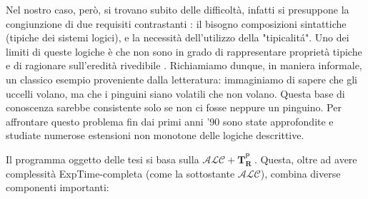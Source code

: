 Nel nostro caso, però, si trovano subito delle difficoltà, infatti si presuppone 
la congiunzione di due requisiti contrastanti : il bisogno composizioni sintattiche 
(tipiche dei sistemi logici), e la necessità dell'utilizzo della "tipicalitá".
Uno dei limiti di queste logiche è che non sono in grado di rappresentare proprietà tipiche
e di ragionare sull'eredità rivedibile \cite{ProbOfEx}.
Richiamiamo dunque, in maniera informale, un classico esempio proveniente dalla letteratura: 
immaginiamo di sapere che gli uccelli volano, ma che i pinguini siano volatili che non volano.
Questa base di conoscenza sarebbe consistente solo se non ci fosse neppure un pinguino. 
Per affrontare questo problema fin dai primi anni '90 sono state approfondite e studiate 
numerose estensioni non monotone delle logiche descrittive.\par
Il programma oggetto delle tesi si basa sulla $\mathcal {ALC}+\mathbf{T}_\mathbf{R}^{ \textsf {P} }\ $. 
Questa, oltre ad avere complessità ExpTime-completa (come la sottostante $\mathcal {ALC}$), combina diverse componenti importanti:
